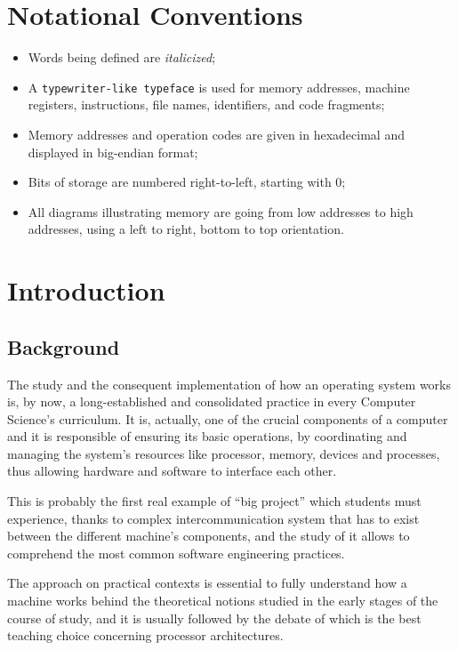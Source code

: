 \documentclass[12pt,a4paper,openright,twoside]{report}
\begin{document}
\chapter*{Notational Conventions}
\begin{itemize}
	\item Words being defined are \textit{italicized};
	\item A \texttt{typewriter-like typeface} is used for memory addresses, machine registers, instructions, file names, identifiers, and code fragments;
	\item Memory addresses and operation codes are given in hexadecimal and displayed in big-endian format;
	\item Bits of storage are numbered right-to-left, starting with 0;
	\item All diagrams illustrating memory are going from low addresses to high addresses, using a left to right, bottom to top orientation.
\end{itemize}

\clearpage{\pagestyle{empty}\cleardoublepage}
\chapter{Introduction}
\lhead[\fancyplain{}{\bfseries\thepage}]{\fancyplain{}{\bfseries\rightmark}}

\section{Background}
The study and the consequent implementation of how an operating system works is, by now, a long-established and consolidated practice in every Computer Science's curriculum.
It is, actually, one of the crucial components of a computer and it is responsible of ensuring its basic operations, by coordinating and managing the system's resources like processor, memory, devices and processes, thus allowing hardware and software to interface each other.

This is probably the first real example of ``big project'' which students must experience, thanks to complex intercommunication system that has to exist between the different machine's components, and the study of it allows to comprehend the most common software engineering practices.

The approach on practical contexts is essential to fully understand how a machine works behind the theoretical notions studied in the early stages of the course of study, and it is usually followed by the debate of which is the best teaching choice concerning processor architectures.
\end{document}
